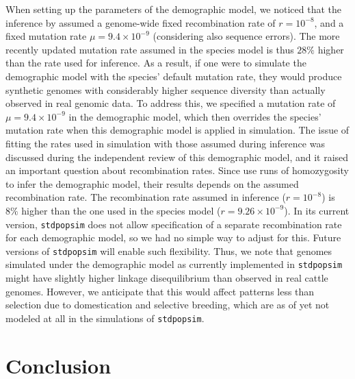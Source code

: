 \documentclass[hidelinks]{article}
\newcommand{\stdpopsim}{\texttt{stdpopsim}\xspace}
\begin{document}
When setting up the parameters of the demographic model, we noticed that the inference by \cite{MacLeod2013} assumed a genome-wide fixed recombination rate of \(r=10^{-8}\), and a fixed mutation rate \(\mu=9.4 \times 10^{-9}\) (considering also sequence errors).
%
The more recently updated mutation rate assumed in the species model \citep[\(1.2\times 10^{-8}\) from][]{Harland2017}
is thus \(28\%\) higher than the rate used for inference.
%
As a result, if one were to simulate the demographic model with the species' default mutation rate, they would produce synthetic genomes with considerably higher sequence diversity than actually observed in real genomic data.
%
To address this, we specified a mutation rate of \(\mu=9.4 \times 10^{-9}\) in the demographic model,
which then overrides the species' mutation rate when this demographic model is applied in simulation.
%
The issue of fitting the rates used in simulation with those assumed during inference was discussed during the independent review of this demographic model, and it raised an important question about recombination rates. Since \cite{MacLeod2013} use runs of homozygosity to infer the demographic model, their results depends on the assumed recombination rate. The recombination rate assumed in inference (\(r=10^{-8}\)) is \(8\%\) higher than the one used in the species model (\(r=9.26\times 10^{-9}\)). In its current version, \stdpopsim does not allow specification of a separate recombination rate for each demographic model, so we had no simple way to adjust for this. Future versions of \stdpopsim will enable such flexibility. Thus, we note that genomes simulated under the demographic model as currently implemented in \stdpopsim 
might have slightly higher linkage disequilibrium than observed in real cattle genomes.
However, we anticipate that this would affect patterns less
than selection due to domestication and selective breeding,
which are as of yet not modeled at all in the simulations of \stdpopsim.

\section*{Conclusion}
    \label{conclusion}
\end{document}
